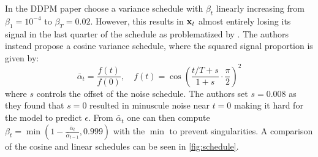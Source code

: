 In the DDPM paper \cite{ho2020denoising} choose a variance schedule with $\beta_t$ linearly increasing from $\beta_1 = 10^{-4}$ to $\beta_T = 0.02$. However, this results in $\boldsymbol{\mathbf{x}}_t$ almost entirely losing its signal in the last quarter of the schedule as problematized by \cite{pmlrv139nichol21a}. The authors instead propose a cosine variance schedule, where the squared signal proportion is given by:
\begin{equation}
    \bar{\alpha}_t=\frac{f(t)}{f(0)}, \quad f(t)=\cos \left(\frac{t / T+s}{1+s} \cdot \frac{\pi}{2}\right)^2
\end{equation}
where $s$ controls the offset of the noise schedule. The authors set $s=0.008$ as they found that $s=0$ resulted in minuscule noise near $t=0$ making it hard for the model to predict $\epsilon$. From $\bar{\alpha}_t$ one can then compute $\beta_t = \min\left( 1 - \frac{\bar{\alpha}_t}{\bar{\alpha}_{t-1}}, 0.999 \right)$ with the $\min$ to prevent singularities. A comparison of the cosine and linear schedules can be seen in \cref{fig:schedule}. 


